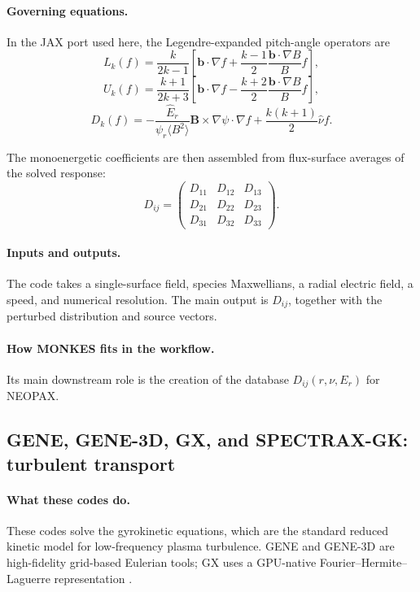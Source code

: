 \documentclass[11pt]{article}
\begin{document}
\paragraph{Governing equations.}
In the JAX port used here, the Legendre-expanded pitch-angle operators are
\begin{equation}
L_k(f)=\frac{k}{2k-1}\left[\mathbf{b}\cdot\nabla f + \frac{k-1}{2}\frac{\mathbf{b}\cdot\nabla B}{B}f\right],
\end{equation}
\begin{equation}
U_k(f)=\frac{k+1}{2k+3}\left[\mathbf{b}\cdot\nabla f - \frac{k+2}{2}\frac{\mathbf{b}\cdot\nabla B}{B}f\right],
\end{equation}
\begin{equation}
D_k(f)= -\frac{\hat E_r}{\psi_r\langle B^2\rangle}\mathbf{B}\times\nabla\psi\cdot\nabla f + \frac{k(k+1)}{2}\hat\nu f.
\end{equation}

The monoenergetic coefficients are then assembled from flux-surface averages of
the solved response:
\begin{equation}
D_{ij} =
\begin{pmatrix}
D_{11} & D_{12} & D_{13}\\
D_{21} & D_{22} & D_{23}\\
D_{31} & D_{32} & D_{33}
\end{pmatrix}.
\end{equation}

\paragraph{Inputs and outputs.}
The code takes a single-surface field, species Maxwellians, a radial electric
field, a speed, and numerical resolution. The main output is $D_{ij}$, together
with the perturbed distribution and source vectors.

\paragraph{How MONKES fits in the workflow.}
Its main downstream role is the creation of the database
$D_{ij}(r,\nu,E_r)$ for NEOPAX.

\subsection{GENE, GENE-3D, GX, and SPECTRAX-GK: turbulent transport}

\paragraph{What these codes do.}
These codes solve the gyrokinetic equations, which are the standard reduced
kinetic model for low-frequency plasma turbulence. GENE and GENE-3D are
high-fidelity grid-based Eulerian tools; GX uses a GPU-native
Fourier--Hermite--Laguerre representation \citep{Gorler2011GENE,Merz2012GENE,Xanthopoulos2020GENE3D,Mandell2018,Mandell2024GX,GENEWebsite,GXRepo,SpectraxGKRepo}.
\end{document}
